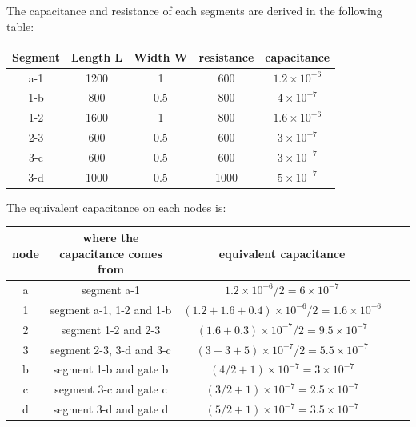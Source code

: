 \documentclass[12pt]{article}
\begin{document}
    The capacitance and resistance of each segments are derived in the following table:
    \begin{center}
        \begin{tabular}{|c|c|c|c|c|}
            \hline
            Segment & Length L & Width W & resistance & capacitance \\
            \hline
            a-1 & 1200 & 1 & 600 & $1.2\times 10^{-6}$ \\
            \hline
            1-b & 800 & 0.5 & 800 & $4\times 10^{-7}$ \\
            \hline
            1-2 & 1600 & 1 & 800 & $1.6\times 10^{-6}$ \\
            \hline
            2-3 & 600 & 0.5 & 600 & $3\times 10^{-7}$ \\
            \hline
            3-c & 600 & 0.5 & 600 & $3\times 10^{-7}$ \\
            \hline
            3-d & 1000 & 0.5 & 1000 & $5\times 10^{-7}$ \\
            \hline
        \end{tabular}
    \end{center}

    The equivalent capacitance on each nodes is:
    \begin{center}
        \begin{tabular}{|c|c|c|c|c|}
            \hline
            node & where the capacitance comes from & equivalent capacitance \\
            \hline
            a & segment a-1 & $1.2\times 10^{-6}/2=6\times 10^{-7}$ \\
            \hline
            1 & segment a-1, 1-2 and 1-b & $(1.2+1.6+0.4)\times 10^{-6}/2=1.6\times 10^{-6}$\\
            \hline
            2 & segment 1-2 and 2-3 & $(1.6+0.3)\times 10^{-7}/2=9.5\times 10^{-7}$ \\
            \hline
            3 & segment 2-3, 3-d and 3-c & $(3+3+5)\times 10^{-7}/2=5.5\times 10^{-7}$ \\
            \hline
            b & segment 1-b and gate b & $(4/2+1)\times 10^{-7}=3\times 10^{-7}$ \\
            \hline
            c & segment 3-c and gate c & $(3/2+1)\times 10^{-7}=2.5\times 10^{-7}$ \\
            \hline
            d & segment 3-d and gate d & $(5/2+1)\times 10^{-7}=3.5\times 10^{-7}$ \\
            \hline
        \end{tabular}
    \end{center}
\end{document}
